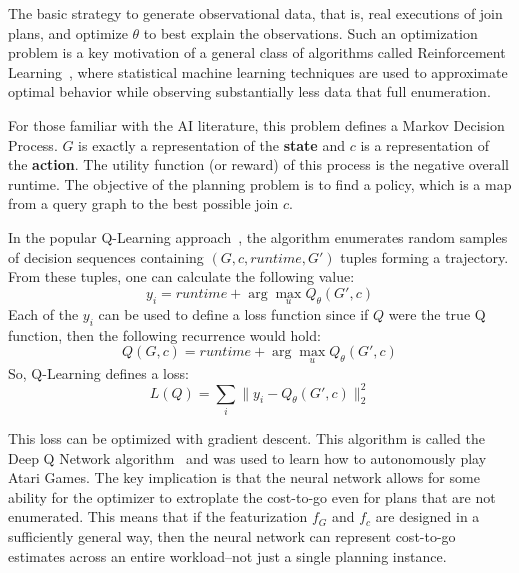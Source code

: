 The basic strategy to generate observational data, that is, real executions of join plans, and optimize $\theta$ to best explain the observations. Such an optimization problem is a key motivation of a general class of algorithms called Reinforcement Learning~\cite{sutton1998reinforcement}, where statistical machine learning techniques are used to approximate optimal behavior while observing substantially less data that full enumeration. 

For those familiar with the AI literature, this problem defines a Markov Decision Process. $G$ is exactly a representation of the \textbf{state} and $c$ is a representation of the \textbf{action}.
The utility function (or reward) of this process is the negative overall runtime.
The objective of the planning problem is to find a policy, which is a map from a query graph to the best possible join $c$.

In the popular Q-Learning approach~\cite{sutton1998reinforcement}, the algorithm enumerates random samples of decision sequences containing $(G,c, runtime, G')$ tuples forming a trajectory. From these tuples, one can calculate the following value:
\[
y_i = runtime + \arg \max_{u} Q_\theta(G',c)
\]
Each of the $y_i$ can be used to define a loss function since if $Q$ were the true Q function, then the following recurrence would hold:
\[
Q(G,c) = runtime + \arg \max_{u} Q_\theta(G',c)
\]
So, Q-Learning defines a loss:
\[
L(Q) = \sum_{i} \|y_i - Q_\theta(G',c)\|_2^2
\]

This loss can be optimized with gradient descent.
This algorithm is called the Deep Q Network algorithm~\cite{mnih2015human} and was used to learn how to autonomously play Atari Games.
The key implication is that the neural network allows for some ability for the optimizer to extroplate the cost-to-go even for plans that are not enumerated. This means that if the featurization $f_G$ and $f_c$ are designed in a sufficiently general way, then the neural network can represent cost-to-go estimates across an entire workload--not just a single planning instance.
